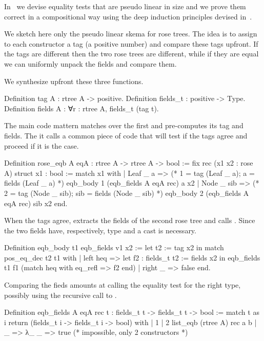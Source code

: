 \documentclass[a4paper, 11pt]{book}
\begin{document}
In~\cite{gregoire:hal-03800154} we devise equality tests that are pseudo
linear in size and we prove them correct in a compositional way using the deep
induction principles devised in~\cite{tassi:hal-01897468}.

We sketch here only the pseudo linear skema for rose trees. The idea
is to assign to each constructor a tag (a positive number) and
compare these tags upfront. If the tags are different then
the two rose trees are different, while if they are equal we can
uniformly unpack the fields and compare them.

We synthesize upfront these three functions.

\begin{rocqcode}
Definition tag A : rtree A -> positive.
Definition fields_t : positive -> Type.
Definition fields A :  ∀r : rtree A, fields_t (tag t).
\end{rocqcode}

The main code mattern matches over the first  and 
pre-computes its tag and fields. The it calls a common piece of
code  that will test if the tags agree and proceed
if it is the case.

\begin{rocqcode}
Definition rose_eqb A eqA : rtree A -> rtree A -> bool := 
  fix rec (x1 x2 : rose A) {struct x1} : bool :=
    match x1 with
    | Leaf _ a =>
        (* 1 = tag (Leaf _ a); a = fields (Leaf _ a) *)
        eqb_body 1 (eqb_fields A eqA rec) a x2
    | Node _ sib =>            
        (* 2 = tag (Node _ sib); sib = fields (Node _ sib) *)
        eqb_body 2 (eqb_fields A eqA rec) sib x2
    end.
\end{rocqcode}

When the tags agree,  extracts the fields
of the second rose tree and calls .
Since the two fields have, respectively, type 
 and  a cast is necessary.

\begin{rocqcode}
Definition eqb_body t1 eqb_fields v1 x2 :=
  let t2 := tag x2 in
  match pos_eq_dec t2 t1 with
  | left heq =>
    let f2 : fields_t t2 := fields x2 in
    eqb_fields t1 f1 (match heq with eq_refl => f2 end)
  | right _ => false
  end.
\end{rocqcode}

Comparing the fieds amounts at calling the equality test for the
right type, possibly using the recursive call to .

\begin{rocqcode}
Definition eqb_fields A eqA rec t :
  fields_t t -> fields_t t -> bool
:=
  match t as i return (fields_t i -> fields_t i -> bool) with
  | 1%
  | 2%
                    list_eqb (rtree A) rec a b
  | _ => λ_ _ => true (* impossible, only 2 constructors *)
\end{rocqcode}
\end{document}
